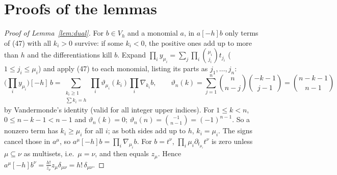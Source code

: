 \documentclass[11pt]{amsart}
\theoremstyle{remark}
\begin{document}
\section{Proofs of the lemmas}\label{sec:proofs}

\begin{proof}[Proof of Lemma~\ref{lem:dual}]
For $b\in V_h$ and a monomial $a$, in $a[-h]b$ only terms of (47) with all $k_i>0$ survive: if some $k_i<0$, the
positive ones add up to more than $h$ and the differentiations kill $b$. Expand $\prod_iy_{\mu_i}=\sum_{j}\prod_i\binom{\mu_i}{j_i}t_{j_i}$
($1\le j_i\le\mu_i$) and apply (47) to each monomial, listing its parts as $j_1,\dots,j_n$:
\[
\Big(\prod_iy_{\mu_i}\Big)[-h]\,b=\sum_{\substack{k_i\ge1\\ \sum k_i=h}}\prod_i\vartheta_{\mu_i}(k_i)\prod_i\nabla_{k_i}b,\qquad
\vartheta_n(k)=\sum_{j=1}^n\binom{n}{n-j}\binom{-k-1}{j-1}=\binom{n-k-1}{n-1}
\]
by Vandermonde's identity (valid for all integer upper indices). For $1\le k<n$, $0\le n-k-1<n-1$ and $\vartheta_n(k)=0$;
$\vartheta_n(n)=\binom{-1}{n-1}=(-1)^{n-1}$. So a nonzero term has $k_i\ge\mu_i$ for all $i$; as both sides add up to $h$,
$k_i=\mu_i$. The signs cancel those in $a^\mu$, so $a^\mu[-h]b=\prod_i\nabla_{\mu_i}b$. For $b=t^\nu$,
$\prod_i\mu_i\partial_{t_{\mu_i}}t^\nu$ is zero unless $\mu\subseteq\nu$ as multisets, i.e.\ $\mu=\nu$, and then
equals $z_\mu$. Hence $a^\mu[-h]b^\nu=\frac{h!}{z_\nu}z_\mu\delta_{\mu\nu}=h!\,\delta_{\mu\nu}$.
\end{proof}
\end{document}
